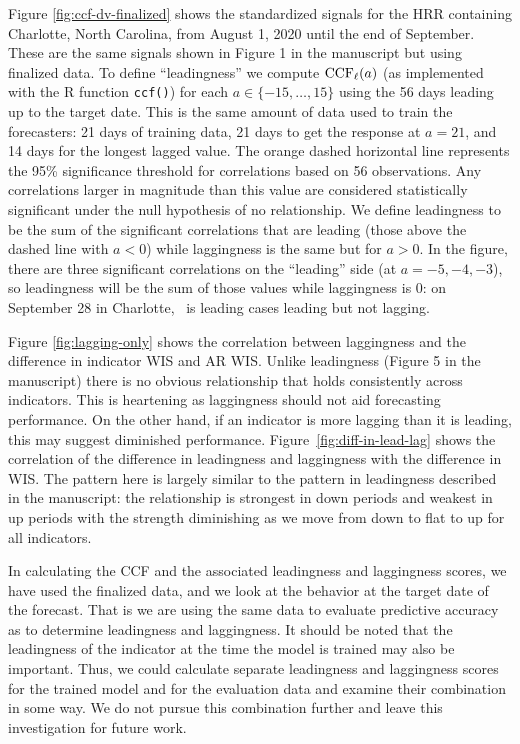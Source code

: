 Figure \ref{fig:ccf-dv-finalized} shows the standardized signals for the HRR
containing Charlotte, North Carolina, from August 1, 2020 until the end of
September. These are the same signals shown in Figure 1 in the manuscript but
using finalized data. To
define ``leadingness'' we compute $\mathrm{CCF}_{\ell}(a)$ (as implemented with the R
function {\tt ccf()}) for each $a\in
\{-15,\ldots,15\}$ using the 56 days leading up to the target date. This is the same
amount of data used to train the forecasters: 21 days of training data, 21 days
to get the response at $a=21$, and 14 days for the longest lagged value. The
orange dashed horizontal line represents the 95\% significance threshold for
correlations based on 56 observations. Any correlations larger in magnitude than
this value are considered statistically significant under the null hypothesis of
no relationship. We define leadingness to be the sum of the significant
correlations that are leading (those above the dashed line with $a<0$) while
laggingness is the same but for $a>0$. In the figure, there are three
significant correlations on the ``leading'' side (at $a = -5, -4, -3$), so
leadingness will be the sum of those values while laggingness is 0:
on September 28 in Charlotte, \dv~is leading cases
leading but not lagging.

Figure \ref{fig:lagging-only} shows the correlation between laggingness and the
difference in indicator WIS and AR WIS. Unlike leadingness (Figure 5 in the
manuscript) there is no obvious relationship that holds consistently
across indicators. This is heartening as laggingness
should not aid forecasting performance. On the other hand, if an indicator is
more lagging than it is leading, this may suggest diminished performance.
Figure~\ref{fig:diff-in-lead-lag} shows the correlation of the difference in
leadingness and laggingness with the difference in WIS. The pattern here is
largely similar to the pattern in leadingness described in the manuscript: the
relationship is strongest in down periods and weakest in up periods with the
strength diminishing as we move from down to flat to up for all indicators.

In calculating the CCF and the associated leadingness and laggingness scores, we
have used the finalized data, and we look at the behavior at the 
target date of the forecast. That is we are using the same data to
evaluate predictive accuracy as to determine
leadingness and laggingness. It should be noted that the leadingness of the
indicator at the time the model is trained may also be important. Thus, we could
calculate separate leadingness and laggingness scores for the trained model and
for the evaluation data and examine their combination in some way. We do not
pursue this combination further and leave this investigation for future work.





